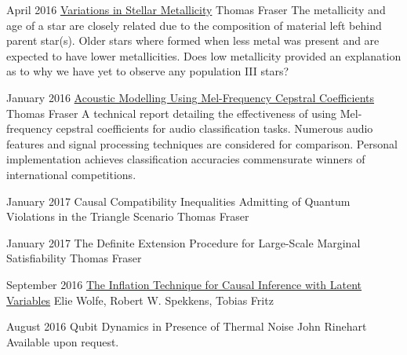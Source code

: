 \documentclass{article}
\begin{document}
        {
            \begin{paperlist}
                \item{April 2016}
                {\href{https://github.com/tcfraser/tcfraser.github.io/raw/master/documents/stellar_metallicity.pdf}{Variations in Stellar Metallicity}}
                {Thomas Fraser}
                {The metallicity and age of a star are closely related due to the composition of material left behind parent star(s). Older stars where formed when less metal was present and are expected to have lower metallicities. Does low metallicity provided an explanation as to why we have yet to observe any population III stars?}
                \item{January 2016}
                {\href{https://github.com/tcfraser/tcfraser.github.io/raw/master/documents/MFCC.pdf}{Acoustic Modelling Using Mel-Frequency Cepstral Coefficients}}
                {Thomas Fraser}
                {A technical report detailing the effectiveness of using Mel-frequency cepstral coefficients for audio classification tasks. Numerous audio features and signal processing techniques are considered for comparison. Personal implementation achieves classification accuracies commensurate winners of international competitions.}
            \end{paperlist}
        }
        {
            \begin{paperlist}
                \item{January 2017}
                {Causal Compatibility Inequalities Admitting of Quantum Violations in the Triangle Scenario}
                {Thomas Fraser}
                {}
                \item{January 2017}
                {The Definite Extension Procedure for Large-Scale Marginal Satisfiability}
                {Thomas Fraser}
                {}
            \end{paperlist}
        }

        {
            \begin{paperlist}
                \item{September 2016}
                {\href{https://arxiv.org/abs/1609.00672}{The Inflation Technique for Causal Inference with Latent Variables}}
                {Elie Wolfe, Robert W. Spekkens, Tobias Fritz}
                {}
                \item{August 2016}
                {Qubit Dynamics in Presence of Thermal Noise}
                {John Rinehart}
                { Available upon request.}
            \end{paperlist}
        }
\end{document}
